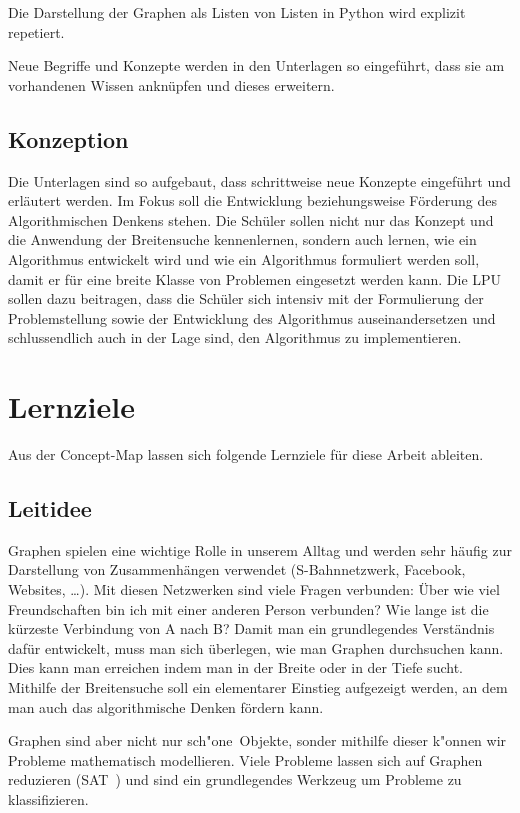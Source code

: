 Die Darstellung der Graphen als Listen von Listen in Python wird explizit repetiert.


Neue Begriffe und Konzepte werden in den Unterlagen so eingef\"uhrt, dass sie am vorhandenen Wissen ankn\"upfen und dieses erweitern.

\subsection{Konzeption}
Die Unterlagen sind so aufgebaut, dass schrittweise neue Konzepte eingef\"uhrt und erl\"autert werden. Im Fokus soll die Entwicklung beziehungsweise F\"orderung des Algorithmischen Denkens stehen. Die Sch\"uler sollen nicht nur das Konzept und die Anwendung der Breitensuche kennenlernen, sondern auch lernen, wie ein Algorithmus entwickelt wird und wie ein Algorithmus formuliert werden soll, damit er f\"ur eine breite Klasse von Problemen eingesetzt werden kann. Die LPU sollen dazu beitragen, dass die Sch\"uler sich intensiv mit der Formulierung der Problemstellung sowie der Entwicklung des Algorithmus auseinandersetzen und schlussendlich auch in der Lage sind, den Algorithmus zu implementieren.


\section{Lernziele}

Aus der Concept-Map lassen sich folgende Lernziele für diese Arbeit ableiten. 

\subsection{Leitidee}

Graphen spielen eine wichtige Rolle in unserem Alltag und werden sehr häufig zur Darstellung von Zusammenhängen verwendet (S-Bahnnetzwerk, Facebook, Websites, \dots). 
Mit diesen Netzwerken sind viele Fragen verbunden: Über wie viel Freundschaften bin ich mit einer anderen Person verbunden? Wie lange ist die kürzeste Verbindung von A nach B?
Damit man ein grundlegendes Verständnis dafür entwickelt, muss man sich überlegen, wie man Graphen durchsuchen kann. 
Dies kann man erreichen indem man in der Breite oder in der Tiefe sucht. 
Mithilfe der Breitensuche soll ein elementarer Einstieg aufgezeigt werden, an dem man auch das algorithmische Denken fördern kann.

Graphen sind aber nicht nur \glqq sch"one\grqq\ Objekte, sonder mithilfe dieser k"onnen wir Probleme mathematisch modellieren. 
Viele Probleme lassen sich auf Graphen reduzieren (SAT~\cite{hrom1}) und sind ein grundlegendes Werkzeug um Probleme zu klassifizieren. 


